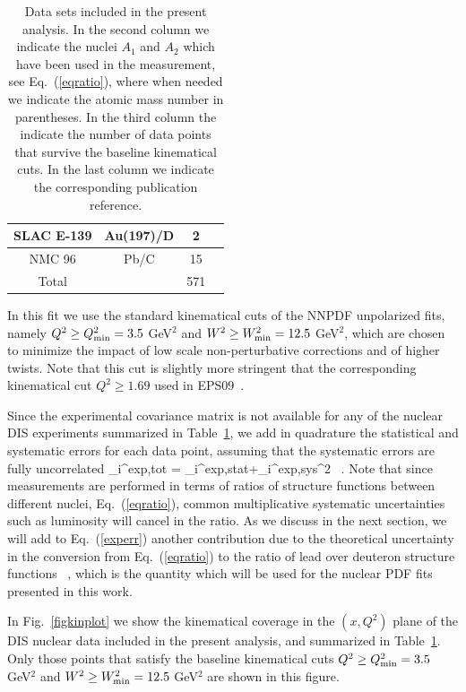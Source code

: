 \begin{table}[t]
\begin{tabular}{c c c c}
\hline
  SLAC E-139 & Au(197)/D & 2 & \cite{PhysRevD.49.4348}\\
\hline
 NMC 96 & Pb/C & 15 & \cite{Arneodo:1996rv}\\
 \hline
 \hline
 Total & & 571 & \\
\hline
\end{tabular}
\caption{\small Data sets included in the present analysis.
  In the second column we indicate the nuclei $A_1$ and $A_2$ which
  have been used in the measurement, see Eq.~(\ref{eqratio}),
  where when needed we indicate the atomic mass
  number in  parentheses.
  In the third column the indicate the number of data points that
  survive the baseline kinematical cuts.
  In the last column we indicate the corresponding publication reference.
}
\label{dataset}
\end{table}


In this fit we use the standard kinematical cuts of the NNPDF unpolarized
fits, namely $Q^2 \ge Q^2_{\rm min}=3.5$ GeV$^2$ and $W^2 \ge W^2_{\rm min}=12.5$
GeV$^2$, which are chosen to minimize the impact of low scale non-perturbative
corrections and of higher twists.
%
Note that this cut is slightly more stringent that the
corresponding kinematical cut $Q^2 \ge 1.69$  used in
EPS09~\cite{Eskola:2009uj}.



Since the experimental covariance matrix is not available for any of
the nuclear DIS experiments summarized in Table~\ref{dataset},
we add in quadrature the statistical and systematic errors for each
data point, assuming that the systematic errors are fully uncorrelated
\be
\label{experr}
\sigma_i^{\rm exp,tot} = \lp \sigma_i^{\rm exp,stat}+\sigma_i^{\rm exp,sys}\rp^2 \, .
\ee
Note that since measurements are performed in terms of ratios of
structure functions between different nuclei, Eq.~(\ref{eqratio}),
common multiplicative systematic uncertainties such as luminosity will
cancel in the ratio.
%
As we discuss in the next section, we will add to
Eq.~(\ref{experr}) another contribution due to the theoretical
uncertainty in the conversion from Eq.~(\ref{eqratio}) to the ratio
of lead over deuteron structure functions
\be
\label{eqratio2}
 \, ,
\ee
which is the quantity which will be used for the nuclear
PDF fits presented in this work.

In Fig.~\ref{figkinplot} we show the
kinematical coverage in the $(x,Q^2)$ plane
  of the DIS nuclear data included in the present analysis,
  and summarized in Table~\ref{dataset}.
  Only those points that satisfy the baseline kinematical
  cuts $Q^2 \ge Q^2_{\rm min}=3.5$ GeV$^2$ and $W^2 \ge W^2_{\rm min}=12.5$
GeV$^2$ are shown in this figure.

